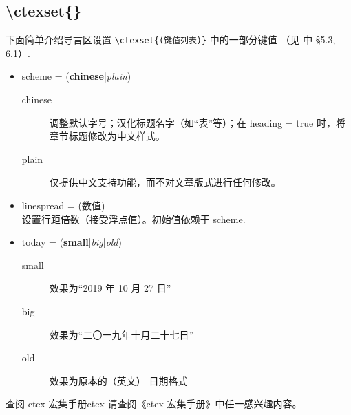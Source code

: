 \subsection{\textbackslash ctexset\{\}}
下面简单介绍导言区设置 \verb|\ctexset{(键值列表)}| 中的一部分键值 （见 \cite{ctex} 中 \S 5.3, 6.1）.
\begin{itemize}
\item scheme = (\textbf{chinese}|\emph{plain})
\begin{description}
  \item[chinese] 调整默认字号；汉化标题名字（如“表”等）；在 heading = true 时，将章节标题修改为中文样式。
  \item[plain] 仅提供中文支持功能，而不对文章版式进行任何修改。 
  \end{description}
\item linespread = (数值)\\
设置行距倍数（接受浮点值）。初始值依赖于 scheme.
\item today = (\textbf{small}|\emph{big}|\emph{old})
\begin{description}
  \item[small] 效果为“2019 年 10 月 27 日”
  \item[big] 效果为“二〇一九年十月二十七日”
  \item[old] 效果为原本的（英文） 日期格式 
\end{description}
\end{itemize}

\begin{Ex}{查阅 ctex 宏集手册}{ctex}
请查阅《ctex 宏集手册》中任一感兴趣内容。
\end{Ex}